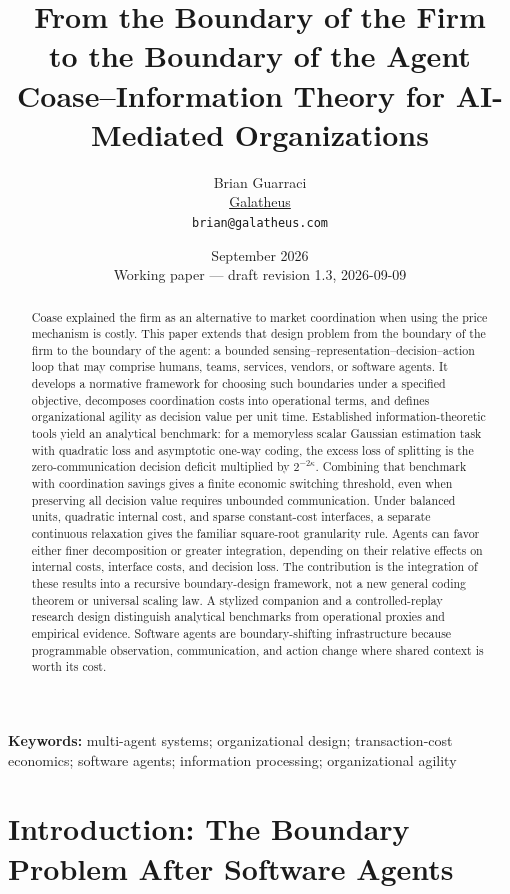 \documentclass[11pt]{article}
\title{\textbf{From the Boundary of the Firm\\
to the Boundary of the Agent}\\
\large Coase--Information Theory for AI-Mediated Organizations}
\author{Brian Guarraci\\
  \href{https://galatheus.com}{Galatheus}\\
  \texttt{brian@galatheus.com}}
\date{September 2026\\[2pt]
{\normalsize Working paper --- draft revision 1.3, 2026-09-09}}
\begin{document}
\maketitle


\begin{abstract}
Coase explained the firm as an alternative to market coordination when using
the price mechanism is costly. This paper extends that design problem from
the boundary of the firm to the boundary of the agent: a bounded
sensing--representation--decision--action loop that may comprise humans,
teams, services, vendors, or software agents. It develops a normative framework
for choosing such boundaries under a specified objective, decomposes
coordination costs into operational terms, and defines organizational agility
as decision value per unit time. Established information-theoretic tools yield
an analytical benchmark: for a memoryless scalar Gaussian estimation task
with quadratic loss and asymptotic one-way coding, the excess loss of splitting
is the zero-communication decision deficit multiplied by $2^{-2\kappa}$.
Combining that benchmark with coordination savings gives a finite economic
switching threshold, even when preserving all decision value requires
unbounded communication. Under balanced units, quadratic internal cost, and
sparse constant-cost interfaces, a separate continuous relaxation gives the
familiar square-root granularity rule. Agents can favor either finer
decomposition or greater integration, depending on their relative effects on
internal costs, interface costs, and decision loss. The contribution is the
integration of these results into a recursive boundary-design framework, not
a new general coding theorem or universal scaling law. A stylized companion
and a controlled-replay research design distinguish analytical benchmarks from
operational proxies and empirical evidence. Software agents are
boundary-shifting infrastructure because programmable observation,
communication, and action change where shared context is worth its cost.
\end{abstract}

\noindent\textbf{Keywords:} multi-agent systems; organizational design;
transaction-cost economics; software agents; information processing;
organizational agility

\vspace{0.75em}

\section{Introduction: The Boundary Problem After Software Agents}
\end{document}
